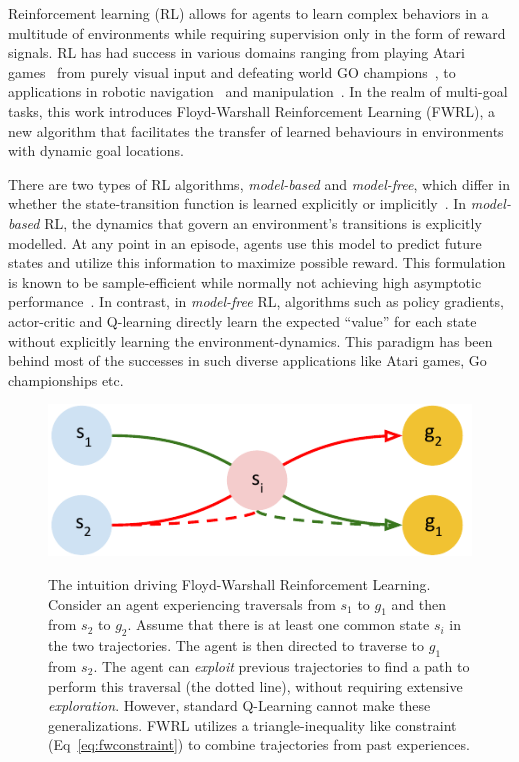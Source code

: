 Reinforcement learning (RL) allows for agents to learn complex behaviors
in a multitude of environments while requiring supervision only in the
form of reward signals. RL has had success in various domains ranging
from playing Atari games~\citep{MnKaSiNATURE2015} from purely visual
input and defeating world GO champions~\citep{gibney2016google}, to
applications in robotic navigation~\citep{mirowski2018learning} and
manipulation~\cite{levine2018learning}. In the realm of multi-goal tasks,
this work introduces Floyd-Warshall Reinforcement Learning (FWRL), a new
algorithm that facilitates the transfer of learned behaviours in
environments with dynamic goal locations.


There are two types of RL algorithms, \emph{model-based} and
\emph{model-free}, which differ in whether the state-transition function
is learned explicitly or implicitly~\citep{SuBaBOOK1998}.  In
\emph{model-based} RL, the dynamics that govern an environment's
transitions is explicitly modelled.  At any point in an episode, agents
use this model to predict future states and utilize this information to
maximize possible reward. This formulation is known to be
sample-efficient while normally not achieving high asymptotic
performance~\citep{pong2018temporal}.  In contrast, in \emph{model-free}
RL, algorithms such as policy gradients, actor-critic and Q-learning
directly learn the expected ``value'' for each state without explicitly
learning the environment-dynamics. This paradigm has been behind most of
the successes in such diverse applications
like Atari games, Go championships etc.

\begin{figure}%
\includegraphics[width=\columnwidth]{./media/optimal_trajectories.pdf}\\
\caption{The intuition driving Floyd-Warshall Reinforcement Learning.
Consider an agent experiencing traversals from $s_1$ to $g_1$ and then from
$s_2$ to $g_2$. Assume that there is at least one common state $s_i$ in
the two trajectories. The agent is then directed to traverse to $g_1$ from
$s_2$. The agent can \emph{exploit} previous trajectories to find a path to
perform this traversal (the dotted line), without requiring extensive
\emph{exploration}. However, standard Q-Learning cannot
make these generalizations. FWRL utilizes a triangle-inequality like constraint
(Eq~\eqref{eq:fwconstraint}) to combine trajectories from past experiences.
}
\label{fig:visual-abstract}%
\end{figure}

